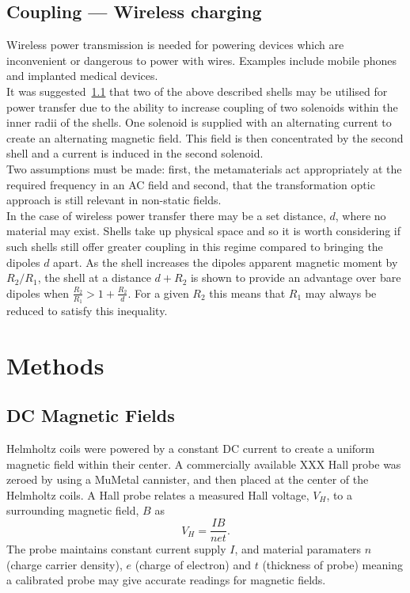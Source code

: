 \documentclass[11pt]{iopart}
\begin{document}
\subsection*{Coupling --- Wireless charging}
Wireless power transmission is needed for powering devices which are
inconvenient or dangerous to power with wires. Examples include mobile
phones and implanted medical devices. \\
It was suggested~\ref{} that two of the above described shells may be utilised for power
transfer due to the ability to increase coupling of two solenoids
within the inner radii of the shells. One solenoid is supplied with an
alternating current to create an alternating magnetic field. This
field is then concentrated by the second shell and a current is
induced in the second solenoid.\\
Two assumptions must be made: first, the metamaterials
act appropriately at the required frequency in an AC field and second, that the transformation optic
approach is still relevant in non-static fields.\\

\noindent In the case of wireless power transfer there may be a set distance, $d$,
where no material may exist. Shells take up physical space and so it
is worth considering if such shells still offer greater coupling in
this regime compared to bringing the dipoles $d$ apart. As the shell increases the dipoles apparent magnetic moment by $R_2/R_1$, the shell at a distance $d+R_2$ is shown to provide an advantage over bare
dipoles when $\frac{R_2}{R_1} > 1+\frac{R_2}{d}$. For a given $R_2$ this means that $R_1$ may always be reduced to satisfy this inequality.

\section{Methods}
\subsection{DC Magnetic Fields}
Helmholtz coils were powered by a constant DC current to create a
uniform magnetic field within their center. A commercially available
XXX Hall probe was zeroed by using a MuMetal cannister, and then
placed at the center of the Helmholtz coils.  A Hall probe relates a
measured Hall voltage, $V_H$, to a surrounding magnetic field, $B$
\cite{XXX} as
\begin{equation}
  V_H = \frac{IB}{net}.
\end{equation}
The probe maintains constant current supply $I$, and material
paramaters $n$ (charge carrier density), $e$ (charge of electron) and
$t$ (thickness of probe) meaning a calibrated probe may give accurate
readings for magnetic fields.\\
\end{document}
